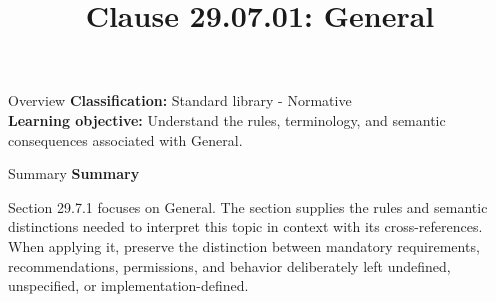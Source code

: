 \documentclass[10pt,letterpaper]{article}
\title{Clause 29.07.01: General}
\author{}
\date{}
\begin{document}
\maketitle
\begin{CornellOverviewBox}{Overview}
\textbf{Classification:} Standard library - Normative\\[2pt]
\textbf{Learning objective:} Understand the rules, terminology, and semantic consequences associated with General.
\end{CornellOverviewBox}\begin{CornellSummaryBox}{Summary}
{\sffamily\bfseries\color{Accent} Summary}\par\vspace{3pt}Section 29.7.1 focuses on General. The section supplies the rules and semantic distinctions needed to interpret this topic in context with its cross-references. When applying it, preserve the distinction between mandatory requirements, recommendations, permissions, and behavior deliberately left undefined, unspecified, or implementation-defined.
\end{CornellSummaryBox}
\end{document}
